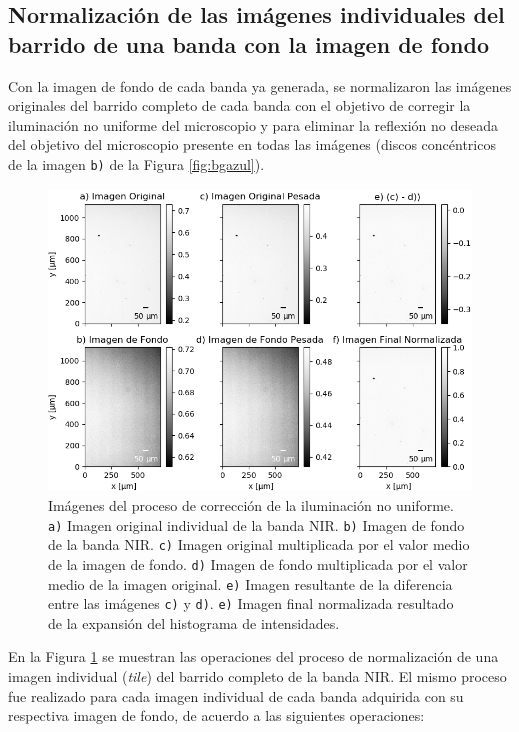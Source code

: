 \singlespacing
\subsection{Normalización de las imágenes individuales del barrido de una banda con la imagen de fondo \href{https://github.com/jrr1984/defects_analysis/blob/master/MAIN/bg_normalization.py}{\faGithub}}
\label{subs:nm}

\hspace{0.5cm} Con la imagen de fondo de cada banda ya generada, se normalizaron las imágenes originales del barrido completo de cada banda\cite{Nordenfelt} con el objetivo de corregir la iluminación no uniforme del microscopio y para eliminar la reflexión no deseada del objetivo del microscopio presente en todas las imágenes (discos concéntricos de la imagen \texttt{b)} de la Figura \ref{fig:bgazul}).
\begin{figure}[H]
	\centering
\includegraphics[scale=0.98]{Figs/defectosZEISS/correccionilum/NIR/1.png}
\caption{Imágenes del proceso de corrección de la iluminación no uniforme. \texttt{a)} Imagen original individual de la banda NIR. \texttt{b)} Imagen de fondo de la banda NIR. \texttt{c)} Imagen original multiplicada por el valor medio de la imagen de fondo. \texttt{d)} Imagen de fondo multiplicada por el valor medio de la imagen original. \texttt{e)} Imagen resultante de la diferencia entre las imágenes \texttt{c)} y \texttt{d)}. \texttt{e)} Imagen final normalizada resultado de la expansión del histograma de intensidades.}
\label{fig:correcilumims}
\end{figure}	
 En la Figura \ref{fig:correcilumims} se muestran las operaciones del proceso de normalización de una imagen individual (\textit{tile}) del barrido completo de la banda NIR. El mismo proceso fue realizado para cada imagen individual de cada banda adquirida con su respectiva imagen de fondo, de acuerdo a las siguientes operaciones:
